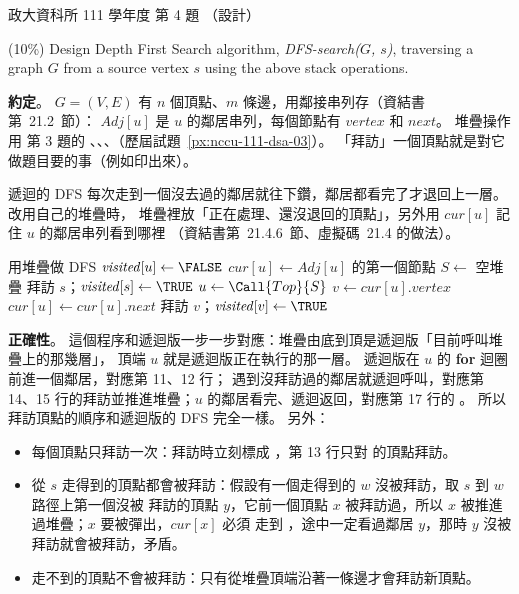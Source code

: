\begin{pastexam}[label={px:nccu-111-dsa-04}]{政大資科所 111 學年度 第 4 題}
（設計）

(10\%) Design Depth First Search algorithm, \textit{DFS-search($G$, $s$)}, traversing a graph $G$ from a source vertex $s$ using the above stack operations.
\end{pastexam}

\begin{pastsoln}
\textbf{約定}。 $G = (V, E)$ 有 $n$ 個頂點、$m$ 條邊，用鄰接串列存（資結書第~21.2~節）：
$\mathit{Adj}[u]$ 是 $u$ 的鄰居串列，每個節點有 $\mathit{vertex}$ 和 $\mathit{next}$。 堆疊操作用
第 3 題的 、、、（歷屆試題~\ref{px:nccu-111-dsa-03}）。
「拜訪」一個頂點就是對它做題目要的事（例如印出來）。

遞迴的 DFS 每次走到一個沒去過的鄰居就往下鑽，鄰居都看完了才退回上一層。 改用自己的堆疊時，
堆疊裡放「正在處理、還沒退回的頂點」，另外用 $\mathit{cur}[u]$ 記住 $u$ 的鄰居串列看到哪裡
（資結書第~21.4.6~節、虛擬碼~21.4 的做法）。

\begin{pseudo}{用堆疊做 DFS}
        \State $\mathit{visited}[u] \gets \FALSE$
        \State $\mathit{cur}[u] \gets \mathit{Adj}[u]$ 的第一個節點
    \EndFor
    \State $S \gets$ 空堆疊 
    \State 拜訪 $s$；$\mathit{visited}[s] \gets \TRUE$
    \State {}
        \State $u \gets \Call{Top}{S}$ 
         
            \State $v \gets \mathit{cur}[u].\mathit{vertex}$
            \State $\mathit{cur}[u] \gets \mathit{cur}[u].\mathit{next}$
                \State 拜訪 $v$；$\mathit{visited}[v] \gets \TRUE$
                \State {} 
            \EndIf
        \Else {}
            \State {}
        \EndIf
    \EndWhile
\EndProcedure
\end{pseudo}

\textbf{正確性}。 這個程序和遞迴版一步一步對應：堆疊由底到頂是遞迴版「目前呼叫堆疊上的那幾層」，
頂端 $u$ 就是遞迴版正在執行的那一層。 遞迴版在 $u$ 的 \textbf{for} 迴圈前進一個鄰居，對應第 11、12 行；
遇到沒拜訪過的鄰居就遞迴呼叫，對應第 14、15 行的拜訪並推進堆疊；$u$ 的鄰居看完、遞迴返回，對應第 17
行的 。 所以拜訪頂點的順序和遞迴版的 DFS 完全一樣。 另外：
\begin{itemize}
\item 每個頂點只拜訪一次：拜訪時立刻標成 \TRUE，第 13 行只對 \FALSE 的頂點拜訪。
\item 從 $s$ 走得到的頂點都會被拜訪：假設有一個走得到的 $w$ 沒被拜訪，取 $s$ 到 $w$ 路徑上第一個沒被
拜訪的頂點 $y$，它前一個頂點 $x$ 被拜訪過，所以 $x$ 被推進過堆疊；$x$ 要被彈出，$\mathit{cur}[x]$ 必須
走到 \NIL，途中一定看過鄰居 $y$，那時 $y$ 沒被拜訪就會被拜訪，矛盾。
\item 走不到的頂點不會被拜訪：只有從堆疊頂端沿著一條邊才會拜訪新頂點。
\end{itemize}


\end{pastsoln}
